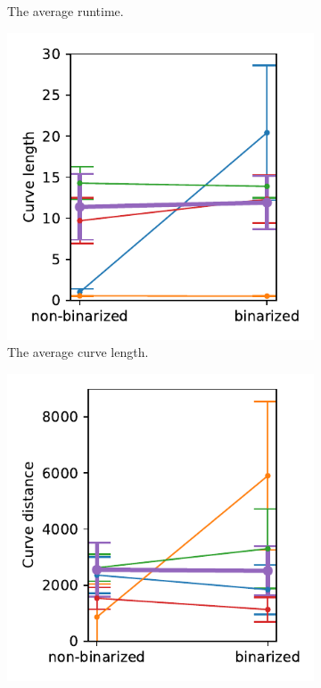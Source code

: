 \begin{figure}[h]
\begin{subfigure}{.3\textwidth}
    \caption{The average runtime.}
\end{subfigure}
    \begin{subfigure}{.3\textwidth}
    \centering
    \includegraphics[width=\textwidth]{graphics/eval/curve length_binarization_sketchbench.pdf}
    \caption{The average curve length.}
\end{subfigure}
    \begin{subfigure}{.3\textwidth}
    \centering
    \includegraphics[width=\textwidth]{graphics/eval/curve distance_binarization_sketchbench.pdf}

\end{subfigure}
\end{figure}
